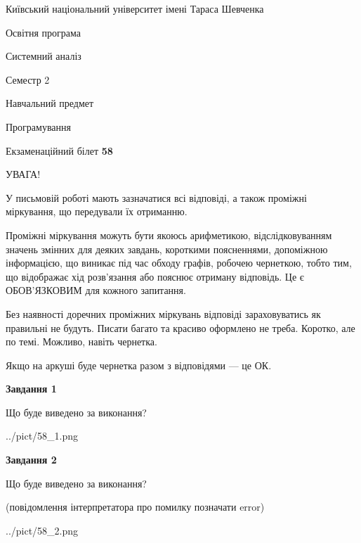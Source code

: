 \documentclass[12pt, ukrainian]{article}
\begin{document}
{{\begin {small}\par
{ \center  Київський національний університет імені Тараса Шевченка \par}
{\parbox {5 cm}{Освітня програма \hfill}{\parbox {7 cm}{Системний аналіз \hfill}}\parbox {6 cm}{\hfill Семестр 2}}\par
{\parbox {5 cm} {Навчальний предмет \hfill}\parbox {7 cm}{Програмування \hfill}\parbox {6cm}{\hfill}\par}\vspace{-7pt} \end{small}}{\center Екзаменаційний білет \No \textbf
{ 58 }\par}}
{
\begin {large}
УВАГА!

У письмовій роботі мають зазначатися всі відповіді, а також проміжні міркування, що передували їх отриманню.

Проміжні міркування можуть бути якоюсь арифметикою, відслідковуванням зна\-чень змінних для деяких завдань,
короткими поясненнями, допоміжною інформацією, що виникає під час обходу графів, робочею чернеткою,
тобто тим, що відображає хід розв’язання або пояснює отриману відповідь.
Це є ОБОВ’ЯЗКОВИМ для кожного запитання.

Без наявності доречних проміжних міркувань відповіді зараховуватись як правиль\-ні не будуть.
Писати багато та красиво оформлено не треба. Коротко, але по темі. Можли\-во, навіть чернетка.

Якщо на аркуші буде чернетка разом з відповідями --- це ОК.

\newpage

{\begin {center}\textbf{Завдання 1}\end {center}}\par
Що буде виведено за виконання?\par
\begin{center}
	{../pict/58_1.png}
\end{center}
\newpage

{\begin {center}\textbf{Завдання 2}\end {center}}\par
Що буде виведено за виконання?\par
 (повідомлення інтерпретатора про помилку позначати error)\par
\begin{center}
	{../pict/58_2.png}
\end{center}
\newpage


\end{large}}
\end{document}
